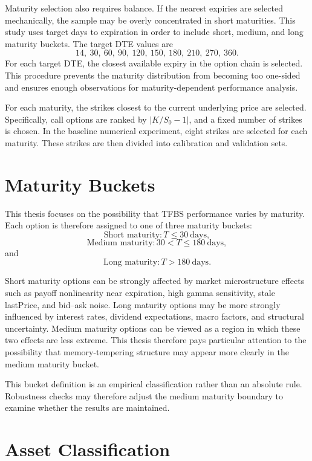 \documentclass[11pt,a4paper]{report}
\begin{document}
Maturity selection also requires balance. If the nearest expiries are selected mechanically, the sample may be overly concentrated in short maturities. This study uses target days to expiration in order to include short, medium, and long maturity buckets. The target DTE values are
\[
14,\ 30,\ 60,\ 90,\ 120,\ 150,\ 180,\ 210,\ 270,\ 360.
\]
For each target DTE, the closest available expiry in the option chain is selected. This procedure prevents the maturity distribution from becoming too one-sided and ensures enough observations for maturity-dependent performance analysis.

For each maturity, the strikes closest to the current underlying price are selected. Specifically, call options are ranked by $|K/S_0-1|$, and a fixed number of strikes is chosen. In the baseline numerical experiment, eight strikes are selected for each maturity. These strikes are then divided into calibration and validation sets.

\section{Maturity Buckets}

This thesis focuses on the possibility that TFBS performance varies by maturity. Each option is therefore assigned to one of three maturity buckets:
\[
\text{Short maturity}:
T\le 30\ \text{days},
\]
\[
\text{Medium maturity}:
30<T\le 180\ \text{days},
\]
and
\[
\text{Long maturity}:
T>180\ \text{days}.
\]

Short maturity options can be strongly affected by market microstructure effects such as payoff nonlinearity near expiration, high gamma sensitivity, stale lastPrice, and bid--ask noise. Long maturity options may be more strongly influenced by interest rates, dividend expectations, macro factors, and structural uncertainty. Medium maturity options can be viewed as a region in which these two effects are less extreme. This thesis therefore pays particular attention to the possibility that memory-tempering structure may appear more clearly in the medium maturity bucket.

This bucket definition is an empirical classification rather than an absolute rule. Robustness checks may therefore adjust the medium maturity boundary to examine whether the results are maintained.

\section{Asset Classification}
\end{document}
